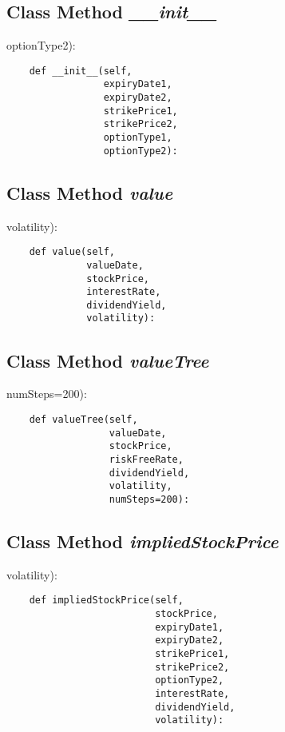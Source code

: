 \documentclass[twoside,11pt]{book}
\begin{document}
\subsection{Class Method {\it \_\_init\_\_}}
optionType2):

\begin{lstlisting}
    def __init__(self,
                 expiryDate1,
                 expiryDate2,
                 strikePrice1,
                 strikePrice2,
                 optionType1,
                 optionType2):
\end{lstlisting}

\subsection{Class Method {\it value}}
volatility):

\begin{lstlisting}
    def value(self,
              valueDate,
              stockPrice,
              interestRate,
              dividendYield,
              volatility):
\end{lstlisting}

\subsection{Class Method {\it valueTree}}
numSteps=200):

\begin{lstlisting}
    def valueTree(self,
                  valueDate,
                  stockPrice,
                  riskFreeRate,
                  dividendYield,
                  volatility,
                  numSteps=200):
\end{lstlisting}

\subsection{Class Method {\it impliedStockPrice}}
volatility):

\begin{lstlisting}
    def impliedStockPrice(self,
                          stockPrice,
                          expiryDate1,
                          expiryDate2,
                          strikePrice1,
                          strikePrice2,
                          optionType2,
                          interestRate,
                          dividendYield,
                          volatility):
\end{lstlisting}
\end{document}
